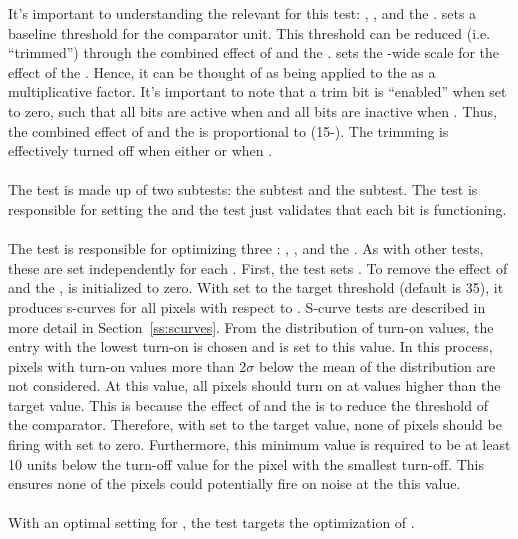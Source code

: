 It's important to understanding the relevant \dacs for this test: \vthrcomp, \vtrim, and the \trimbits.
\vthrcomp sets a baseline threshold for the comparator unit.
This threshold can be reduced (i.e. ``trimmed'') through the combined effect of \vtrim and the \trimbits.
\vtrim sets the \roc-wide scale for the effect of the \trimbits.
Hence, it can be thought of as being applied to the \trimbits as a multiplicative factor.
It's important to note that a trim bit is ``enabled'' when set to zero, 
such that all bits are active when  and all bits are inactive when .
Thus, the combined effect of \vtrim and the \trimbits is proportional to \vtrim(15-\trimbits).
The trimming is effectively turned off when either  or when .
\\\\
The \trimming test is made up of two subtests: the \trim subtest and the \trimbit subtest. 
The \trim test is responsible for setting the \trimbits and the \trimbit test just validates that each bit is functioning.
\\\\
The \trim test is responsible for optimizing three \dacs: \vthrcomp, \vtrim, and the \trimbits.
As with other tests, these \dacs are set independently for each \roc.
First, the \trim test sets \vthrcomp.
To remove the effect of \vtrim and the \trimbits, \vtrim is initialized to zero.
With \vcal set to the target threshold (default is 35), it produces s-curves for all pixels with respect to \vthrcomp.
S-curve tests are described in more detail in Section~\ref{ss:scurves}.
From the distribution of turn-on values, the entry with the lowest \vthrcomp turn-on is chosen and \vthrcomp is set to this value.
In this process, pixels with turn-on values more than 2$\sigma$ below the mean of the distribution are not considered.
At this \vthrcomp value, all pixels should turn on at \vcal values higher than the target value.
This is because the effect of \vtrim and the \trimbits is to reduce the threshold of the comparator.
Therefore, with \vcal set to the target value, none of pixels should be firing with \vtrim set to zero.
Furthermore, this minimum \vthrcomp value is required to be at least 10 \dac units 
below the \vthrcomp turn-off value for the pixel with the smallest \vthrcomp turn-off.
This ensures none of the pixels could potentially fire on noise at the this \vthrcomp value.
\\\\
With an optimal setting for \vthrcomp, the test targets the optimization of \vtrim.
